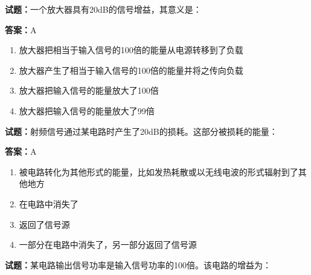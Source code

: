 \documentclass{ctexbook}
\begin{document}




\vspace{1em}

\textbf{试题：}一个放大器具有20dB的信号增益，其意义是： 

\textbf{答案：}A 

\begin{enumerate}[leftmargin=3em]
  \item 放大器把相当于输入信号的100倍的能量从电源转移到了负载 

  \item 放大器产生了相当于输入信号的100倍的能量并将之传向负载 

  \item 放大器把输入信号的能量放大了100倍 

  \item 放大器把输入信号的能量放大了99倍 

\end{enumerate}





\vspace{1em}

\textbf{试题：}射频信号通过某电路时产生了20dB的损耗。这部分被损耗的能量： 

\textbf{答案：}A 

\begin{enumerate}[leftmargin=3em]
  \item 被电路转化为其他形式的能量，比如发热耗散或以无线电波的形式辐射到了其他地方 

  \item 在电路中消失了 

  \item 返回了信号源 

  \item 一部分在电路中消失了，另一部分返回了信号源 

\end{enumerate}





\vspace{1em}

\textbf{试题：}某电路输出信号功率是输入信号功率的100倍。该电路的增益为： 
\end{document}
